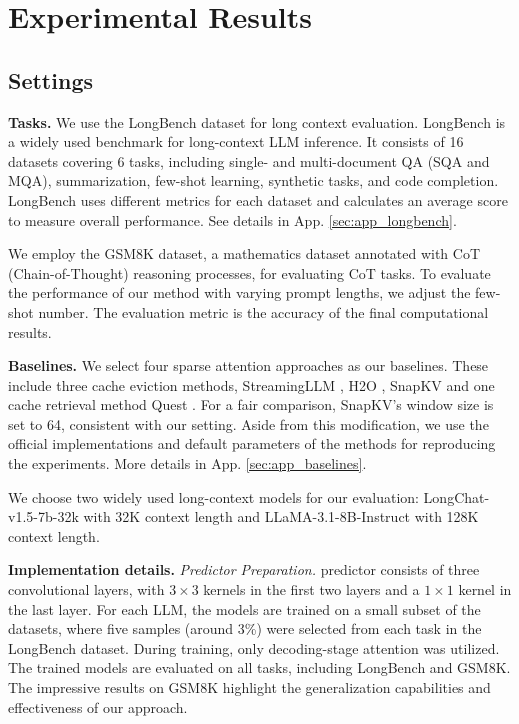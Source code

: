 \section{Experimental Results}
% 


\subsection{Settings}

\textbf{Tasks.}
We use the LongBench \citep{bai2024longbench} dataset for long context evaluation.
LongBench is a widely used benchmark for long-context LLM inference. It consists of 16 datasets covering 6 tasks, including single- and multi-document QA (SQA and MQA), summarization, few-shot learning, synthetic tasks, and code completion. LongBench uses different metrics for each dataset and calculates an average score to measure overall performance. See details in App. \ref{sec:app_longbench}.

We employ the GSM8K \citep{cobbe2021gsm8k} dataset, a mathematics dataset annotated with CoT (Chain-of-Thought) reasoning processes, for evaluating CoT tasks. To evaluate the performance of our method with varying prompt lengths, we adjust the few-shot number. The evaluation metric is the accuracy of the final computational results.

\textbf{Baselines.}
We select four sparse attention approaches as our baselines. These include three cache eviction methods, StreamingLLM \citep{xiao2024streamingllm}, H2O \citep{zhang2023h2o}, SnapKV \citep{li2024snapkv} and one cache retrieval method Quest \citep{tang2024quest}.
For a fair comparison, SnapKV's window size is set to 64, consistent with our setting.
Aside from this modification, we use the official implementations and default parameters of the methods for reproducing the experiments.
More details in App. \ref{sec:app_baselines}.

We choose two widely used long-context models for our evaluation: LongChat-v1.5-7b-32k \citep{kwon2023longchat} with 32K context length and LLaMA-3.1-8B-Instruct \citep{meta2024llama3.1} with 128K context length. 

\textbf{Implementation details.}
\emph{Predictor Preparation.}
\ours predictor consists of three convolutional layers, with \(3 \times 3\) kernels in the first two layers and a \(1 \times 1\) kernel in the last layer. For each LLM, the \ours models are trained on a small subset of the datasets, where five samples (around 3\%) were selected from each task in the LongBench dataset. During training, only decoding-stage attention was utilized.
The trained \ours models are evaluated on all tasks, including LongBench and GSM8K. The impressive results on GSM8K highlight the generalization capabilities and effectiveness of our approach.

